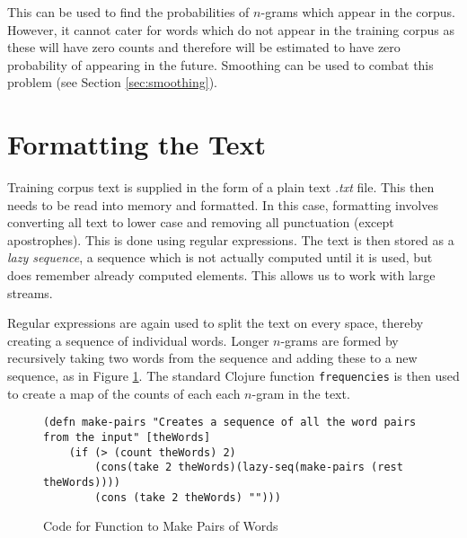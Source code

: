 \noindent This can be used to find the probabilities of $n$-grams which appear in the corpus. However, it cannot cater for words which do not appear in the training corpus as these will have zero counts and therefore will be estimated to have zero probability of appearing in the future. Smoothing can be used to combat this problem (see Section \ref{sec:smoothing}).

\section{Formatting the Text} \label{sec:formattingText}

Training corpus text is supplied in the form of a plain text \textit{.txt} file. This then needs to be read into memory and formatted. In this case, formatting involves converting all text to lower case and removing all punctuation (except apostrophes). This is done using regular expressions. The text is then stored as a \textit{lazy sequence}, a sequence which is not actually computed until it is used, but does remember already computed elements. This allows us to work with large streams.

Regular expressions are again used to split the text on every space, thereby creating a sequence of individual words. Longer $n$-grams are formed by recursively taking two words from the sequence and adding these to a new sequence, as in Figure \ref{fig:makePairsCode}. The standard Clojure function \lstinline!frequencies! is then used to create a map of the counts of each each $n$-gram in the text.


%
%
\begin{figure}[h]
\centering
\singlespacing
\begin{lstlisting}
(defn make-pairs "Creates a sequence of all the word pairs from the input" [theWords] 
	(if (> (count theWords) 2) 
		(cons(take 2 theWords)(lazy-seq(make-pairs (rest theWords)))) 
		(cons (take 2 theWords) "")))
\end{lstlisting}
\doublespacing
\caption{Code for Function to Make Pairs of Words}
\label{fig:makePairsCode}
\end{figure}

